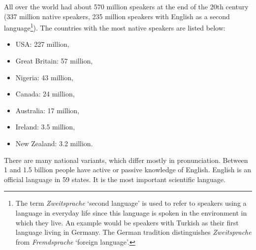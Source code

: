 All over the world  had about 570 million speakers at the end of the 20th century 
(337 million native speakers, 235 million speakers with English as a second language\footnote{%
  The term \emph{Zweitsprache} `second language' is used to refer to speakers using a language in
  everyday life since this language is spoken in the environment in which they live. An example would be speakers with
  Turkish as their first language living in Germany. The German tradition distinguishes
  \emph{Zweitsprache} from \emph{Fremdsprache} `foreign language'.%
}). The countries with the most native speakers are listed below: 
\begin{itemize}
\item USA: 227 million,
\item Great Britain: 57 million,
\item Nigeria: 43 million, 
\item Canada: 24 million,
\item Australia: 17 million,
\item Ireland: 3.5 million,
\item New Zealand: 3.2 million.
\end{itemize}
There are many national variants, which differ mostly in pronunciation.
Between 1 and 1.5 billion people have active or passive knowledge of English.
English is an official language in 59 states. It is the most important scientific language.




